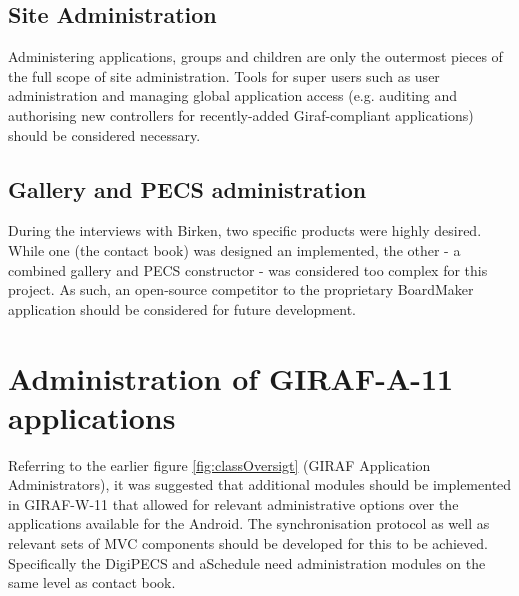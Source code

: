 \subsection*{Site Administration}
Administering applications, groups and children are only the outermost pieces of the full scope of site administration. Tools for super users such as user administration and managing global application access (e.g. auditing and authorising new controllers for recently-added Giraf-compliant applications) should be considered necessary.

\subsection*{Gallery and PECS administration}
During the interviews with Birken, two specific products were highly desired. While one (the contact book) was designed an implemented, the other - a combined gallery and PECS constructor - was considered too complex for this project. As such, an open-source competitor to the proprietary BoardMaker application should be considered for future development.


\section{Administration of GIRAF-A-11 applications}
Referring to the earlier figure \vref{fig:classOversigt} (GIRAF Application Administrators), it was suggested that additional modules should be implemented in GIRAF-W-11 that allowed for relevant administrative options over the applications available for the Android. The synchronisation protocol as well as relevant sets of MVC components should be developed for this to be achieved.
Specifically the DigiPECS and aSchedule need administration modules on the same level as contact book.


